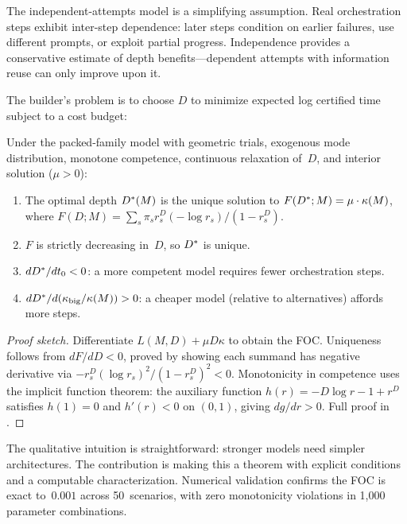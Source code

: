\begin{remark}
\label{rem:independence}
The independent-attempts model is a simplifying assumption.
Real orchestration steps exhibit inter-step dependence: later steps condition on earlier failures, use different prompts, or exploit partial progress.
Independence provides a conservative estimate of depth benefits---dependent attempts with information reuse can only improve upon it.
\end{remark}

The builder's problem is to choose $D$ to minimize expected log certified time subject to a cost budget:

\begin{theorem}
\label{thm:optimal-depth}
Under the packed-family model with geometric trials, exogenous mode distribution, monotone competence, continuous relaxation of~$D$, and interior solution ($\mu > 0$):
\begin{enumerate}[label=(\alph*)]
  \item The optimal depth $D^*(M)$ is the unique solution to $F(D^*; M) = \mu \cdot \kappa(M)$, where $F(D; M) = \sum_s \pi_s r_s^D (-\log r_s) / (1 - r_s^D)$.
  \item $F$ is strictly decreasing in~$D$, so $D^*$ is unique.
  \item $dD^* / dt_0 < 0$: a more competent model requires fewer orchestration steps.
  \item $dD^* / d(\kappa_{\mathrm{big}}/\kappa(M)) > 0$: a cheaper model (relative to alternatives) affords more steps.
\end{enumerate}
\end{theorem}

\begin{proof}[Proof sketch]
Differentiate $L(M,D) + \mu D \kappa$ to obtain the FOC.
Uniqueness follows from $dF/dD < 0$, proved by showing each summand has negative derivative via $-r_s^D (\log r_s)^2 / (1-r_s^D)^2 < 0$.
Monotonicity in competence uses the implicit function theorem: the auxiliary function $h(r) = -D\log r - 1 + r^D$ satisfies $h(1) = 0$ and $h'(r) < 0$ on $(0,1)$, giving $dg/dr > 0$.
Full proof in .
\end{proof}

The qualitative intuition is straightforward: stronger models need simpler architectures.
The contribution is making this a theorem with explicit conditions and a computable characterization.
Numerical validation confirms the FOC is exact to~$0.001$ across 50~scenarios, with zero monotonicity violations in 1{,}000 parameter combinations.

